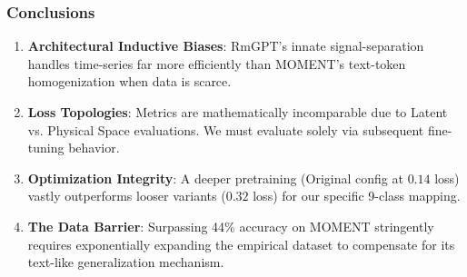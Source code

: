 \documentclass[10pt, aspectratio=169]{beamer}
\begin{document}
\begin{frame}
    \frametitle{Conclusions}
    \begin{enumerate}
        \item \textbf{Architectural Inductive Biases}: RmGPT's innate signal-separation handles time-series far more efficiently than MOMENT's text-token homogenization when data is scarce.
        \item \textbf{Loss Topologies}: Metrics are mathematically incomparable due to Latent vs. Physical Space evaluations. We must evaluate solely via subsequent fine-tuning behavior.
        \item \textbf{Optimization Integrity}: A deeper pretraining (Original config at $0.14$ loss) vastly outperforms looser variants ($0.32$ loss) for our specific 9-class mapping.
        \item \textbf{The Data Barrier}: Surpassing 44\% accuracy on MOMENT stringently requires exponentially expanding the empirical dataset to compensate for its text-like generalization mechanism.
    \end{enumerate}
\end{frame}
\end{document}
